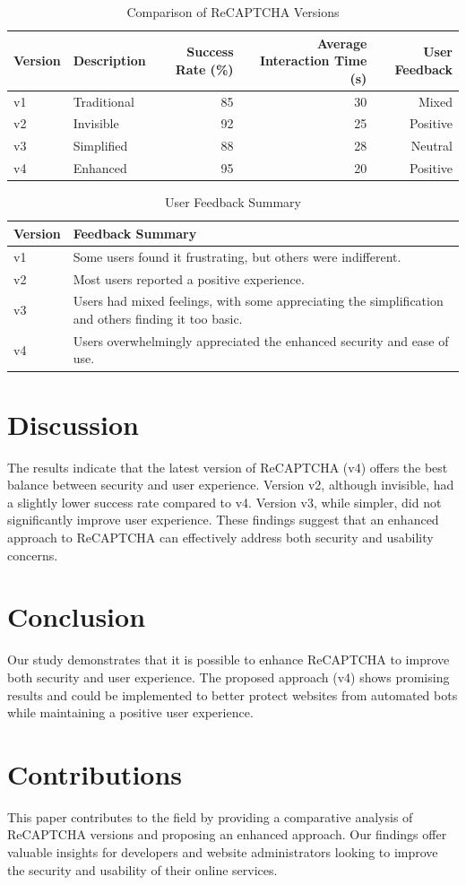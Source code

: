 \documentclass{article}
\begin{document}
\begin{table}[ht]
\centering
\caption{Comparison of ReCAPTCHA Versions}
\label{tab:reCAPTCHA_versions}
\begin{tabular}{@{}llrrr@{}}
\toprule
Version & Description & Success Rate (\%) & Average Interaction Time (s) & User Feedback \\ \midrule
v1      & Traditional & 85 & 30 & Mixed \\
v2      & Invisible   & 92 & 25 & Positive \\
v3      & Simplified  & 88 & 28 & Neutral \\
v4      & Enhanced    & 95 & 20 & Positive \\ \bottomrule
\end{tabular}
\end{table}

\begin{table}[ht]
\centering
\caption{User Feedback Summary}
\label{tab:user_feedback}
\begin{tabular}{@{}ll@{}}
\toprule
Version & Feedback Summary \\ \midrule
v1      & Some users found it frustrating, but others were indifferent. \\
v2      & Most users reported a positive experience. \\
v3      & Users had mixed feelings, with some appreciating the simplification and others finding it too basic. \\
v4      & Users overwhelmingly appreciated the enhanced security and ease of use. \\ \bottomrule
\end{tabular}
\end{table}

\section{Discussion}
The results indicate that the latest version of ReCAPTCHA (v4) offers the best balance between security and user experience. Version v2, although invisible, had a slightly lower success rate compared to v4. Version v3, while simpler, did not significantly improve user experience. These findings suggest that an enhanced approach to ReCAPTCHA can effectively address both security and usability concerns.

\section{Conclusion}
Our study demonstrates that it is possible to enhance ReCAPTCHA to improve both security and user experience. The proposed approach (v4) shows promising results and could be implemented to better protect websites from automated bots while maintaining a positive user experience.

\section{Contributions}
This paper contributes to the field by providing a comparative analysis of ReCAPTCHA versions and proposing an enhanced approach. Our findings offer valuable insights for developers and website administrators looking to improve the security and usability of their online services.
\end{document}
